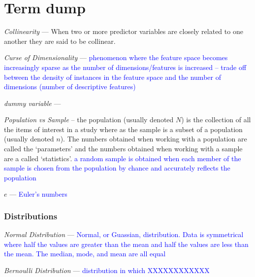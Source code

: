 \chapter{Term dump}

\emph{Collinearity} --- When two or more predictor variables are closely related to one another they are said to be collinear.

\emph{Curse of Dimensionality} --- \textcolor{blue}{phenomenon where the feature space becomes increasingly sparse as the number of dimensions/features is increased -- trade off between the density of instances in the feature space and the number of dimensions (number of descriptive features)}

\emph{dummy variable} ---


\emph{Population vs Sample} -- the population (usually denoted $N$) is the collection of all the items of interest in a study where as the sample is a subset of a population (usually denoted $n$). The numbers obtained when working with a population are called the `parameters' and the numbers obtained when working with a sample are a called `statistics'. \textcolor{blue}{a random sample is obtained when each member of the sample is chosen from the population by chance and accurately reflects the population}

\emph{$e$} --- \textcolor{blue}{Euler's numbers}

\subsection{Distributions}

\emph{Normal Distribution} --- \textcolor{blue}{Normal, or Guassian, distribution. Data is symmetrical where half the values are greater than the mean and half the values are less than the mean. The median, mode, and mean are all equal}

\emph{Bernoulli Distribution} --- \textcolor{blue}{distribution in which XXXXXXXXXXXX}